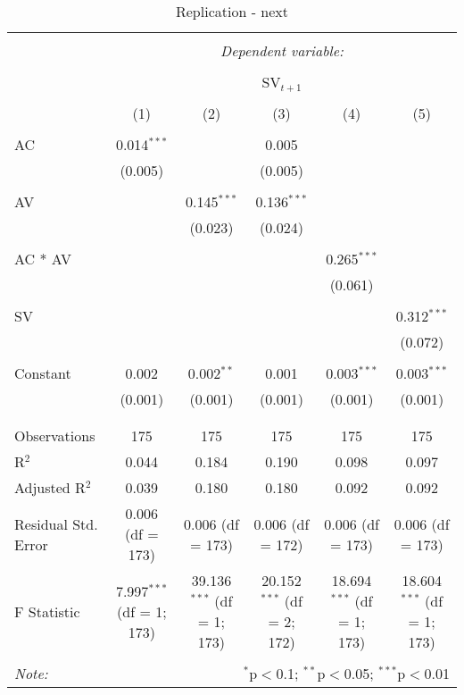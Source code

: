 
\begin{table}[!htbp] \centering 
  \caption{Replication - next } 
  \label{} 
\begin{adjustbox}{width=1\textwidth}
	\begin{tabular}{@{\extracolsep{5pt}}lccccc} 
\\[-1.8ex]\hline 
\hline \\[-1.8ex] 
 & \multicolumn{5}{c}{\textit{Dependent variable:}} \\ 
\cline{2-6} 
\\[-1.8ex] & \multicolumn{5}{c}{SV$_{t+1}$} \\ 
\\[-1.8ex] & (1) & (2) & (3) & (4) & (5)\\ 
\hline \\[-1.8ex] 
 AC & 0.014$^{***}$ &  & 0.005 &  &  \\ 
  & (0.005) &  & (0.005) &  &  \\ 
  & & & & & \\ 
 AV &  & 0.145$^{***}$ & 0.136$^{***}$ &  &  \\ 
  &  & (0.023) & (0.024) &  &  \\ 
  & & & & & \\ 
 AC * AV &  &  &  & 0.265$^{***}$ &  \\ 
  &  &  &  & (0.061) &  \\ 
  & & & & & \\ 
 SV &  &  &  &  & 0.312$^{***}$ \\ 
  &  &  &  &  & (0.072) \\ 
  & & & & & \\ 
 Constant & 0.002 & 0.002$^{**}$ & 0.001 & 0.003$^{***}$ & 0.003$^{***}$ \\ 
  & (0.001) & (0.001) & (0.001) & (0.001) & (0.001) \\ 
  & & & & & \\ 
\hline \\[-1.8ex] 
Observations & 175 & 175 & 175 & 175 & 175 \\ 
R$^{2}$ & 0.044 & 0.184 & 0.190 & 0.098 & 0.097 \\ 
Adjusted R$^{2}$ & 0.039 & 0.180 & 0.180 & 0.092 & 0.092 \\ 
Residual Std. Error & 0.006 (df = 173) & 0.006 (df = 173) & 0.006 (df = 172) & 0.006 (df = 173) & 0.006 (df = 173) \\ 
F Statistic & 7.997$^{***}$ (df = 1; 173) & 39.136$^{***}$ (df = 1; 173) & 20.152$^{***}$ (df = 2; 172) & 18.694$^{***}$ (df = 1; 173) & 18.604$^{***}$ (df = 1; 173) \\ 
\hline 
\hline \\[-1.8ex] 
\textit{Note:}  & \multicolumn{5}{r}{$^{*}$p$<$0.1; $^{**}$p$<$0.05; $^{***}$p$<$0.01} \\ 
\end{tabular} 
\end{adjustbox}
\end{table} 
